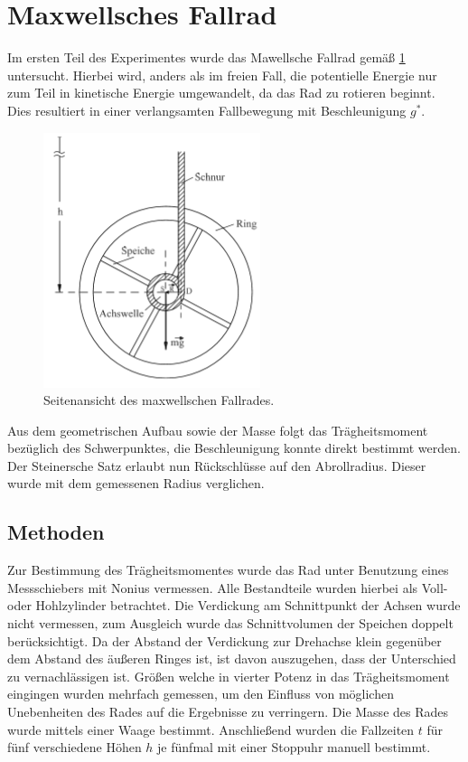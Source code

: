 \section{Maxwellsches Fallrad}



Im ersten Teil des Experimentes wurde das Mawellsche Fallrad gemäß \cref{fig:fallrad} untersucht. Hierbei wird, anders als im freien Fall, die potentielle Energie nur zum Teil in kinetische Energie umgewandelt, da das Rad zu rotieren beginnt. Dies resultiert in einer verlangsamten Fallbewegung mit Beschleunigung $g^*$. \\

\begin{figure}[h] %
	\centering
	\includegraphics[width=0.5\linewidth]{res/Fallrad}
	\caption{Seitenansicht des maxwellschen Fallrades.\cite{lw}}
	\label{fig:fallrad}
\end{figure}


Aus dem geometrischen Aufbau sowie der Masse folgt das Trägheitsmoment bezüglich des Schwerpunktes, die Beschleunigung konnte direkt bestimmt werden. Der Steinersche Satz erlaubt nun Rückschlüsse auf den Abrollradius. Dieser wurde mit dem gemessenen Radius verglichen.






\subsection{Methoden}
Zur Bestimmung des Trägheitsmomentes wurde das Rad unter Benutzung eines Messschiebers mit Nonius vermessen. Alle Bestandteile wurden hierbei als Voll- oder Hohlzylinder betrachtet. Die Verdickung am Schnittpunkt der Achsen wurde nicht vermessen, zum Ausgleich wurde das Schnittvolumen der Speichen doppelt berücksichtigt. Da der Abstand der Verdickung zur Drehachse klein gegenüber dem Abstand des äußeren Ringes ist, ist davon auszugehen, dass der Unterschied zu vernachlässigen ist. Größen welche in vierter Potenz in das Trägheitsmoment eingingen wurden mehrfach gemessen, um den Einfluss von möglichen Unebenheiten des Rades auf die Ergebnisse zu verringern. Die Masse des Rades wurde mittels einer Waage bestimmt.
Anschließend wurden die Fallzeiten $t$ für fünf verschiedene Höhen $h$ je fünfmal mit einer Stoppuhr manuell bestimmt.



